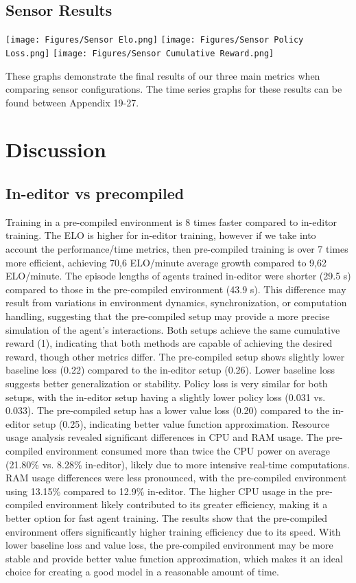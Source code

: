 \documentclass{LSkill}
\begin{document}
\subsection{Sensor Results}

\texttt{[image: Figures/Sensor Elo.png]}
\texttt{[image: Figures/Sensor Policy Loss.png]}
\texttt{[image: Figures/Sensor Cumulative Reward.png]}

These graphs demonstrate the final results of our three main metrics when comparing sensor configurations. The time series graphs for these results can be found between Appendix 19-27. 

\section{Discussion}
\label{sec:discussion}
\subsection{In-editor vs precompiled}

Training in a pre-compiled environment is 8 times faster compared to in-editor training. The ELO is higher for in-editor training, however if we take into account the performance/time metrics, then pre-compiled training is over 7 times more efficient, achieving 70,6 ELO/minute average growth compared to 9,62 ELO/minute. The episode lengths of agents trained in-editor were shorter (29.5 s) compared to those in the pre-compiled environment (43.9 s). This difference may result from variations in environment dynamics, synchronization, or computation handling, suggesting that the pre-compiled setup may provide a more precise simulation of the agent's interactions. Both setups achieve the same cumulative reward (1), indicating that both methods are capable of achieving the desired reward, though other metrics differ. The pre-compiled setup shows slightly lower baseline loss (0.22) compared to the in-editor setup (0.26). Lower baseline loss suggests better generalization or stability. Policy loss is very similar for both setups, with the in-editor setup having a slightly lower policy loss (0.031 vs. 0.033). The pre-compiled setup has a lower value loss (0.20) compared to the in-editor setup (0.25), indicating better value function approximation. Resource usage analysis revealed significant differences in CPU and RAM usage. The pre-compiled environment consumed more than twice the CPU power on average (21.80\% vs. 8.28\% in-editor), likely due to more intensive real-time computations. RAM usage differences were less pronounced, with the pre-compiled environment using 13.15\% compared to 12.9\% in-editor. The higher CPU usage in the pre-compiled environment likely contributed to its greater efficiency, making it a better option for fast agent training.
The results  show that the pre-compiled environment offers significantly higher training efficiency due to its speed. With lower baseline loss and value loss, the pre-compiled environment may be more stable and provide better value function approximation, which makes it an ideal choice for creating a good model in a reasonable amount of time.
\end{document}
